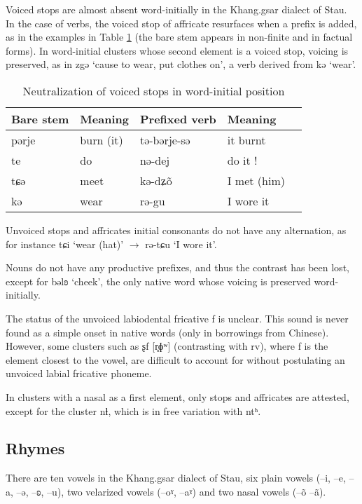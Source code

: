 \documentclass[oneside,a4paper,11pt]{article}
\newcommand{\ipa}[1]{{\phon #1}} %
\begin{document}
Voiced stops are almost absent word-initially in the Khang.gsar dialect of Stau. In the case of verbs, the voiced stop of affricate resurfaces when a prefix is added, as in the examples in Table \ref{tab:voiced} (the bare stem appears in non-finite and in factual forms). In word-initial clusters whose second element is a voiced stop, voicing is preserved, as in \ipa{zgə} `cause to wear, put clothes on', a verb derived from \ipa{kə} `wear'. 

 \begin{table}[H]
 \caption{Neutralization of voiced stops in word-initial position} \label{tab:voiced} \centering 
\begin{tabular}{lllll}
\toprule
Bare stem & Meaning & Prefixed verb & Meaning \\
\midrule
\ipa{pərje} & burn (it) &\ipa{tə-bərje-sə} & it burnt \\
\ipa{te} & do &\ipa{nə-dej} & do it !\\
\ipa{tɕə} & meet &\ipa{kə-dʑõ} & I met (him)\\
\ipa{kə} &wear &\ipa{rə-gu} & I wore it \\
\bottomrule
\end{tabular}
\end{table}
Unvoiced stops and affricates initial consonants do not have any alternation, as for instance \ipa{tɕi} `wear (hat)' $\rightarrow$ \ipa{rə-tɕu} `I wore it'.

Nouns do not have any productive prefixes, and thus the contrast has been lost, except for   \ipa{bəlʚ} `cheek', the only native word whose voicing is preserved word-initially.

 
The status of the unvoiced labiodental fricative \ipa{f} is unclear. This sound is never found as a simple onset in native words (only in borrowings from Chinese). However, some clusters such as  \ipa{ʂf} [\ipa{r̥ɸʷ}] (contrasting with \ipa{rv}), where \ipa{f} is the element closest to the vowel, are difficult to account for without postulating an unvoiced labial fricative phoneme.
 
 In clusters with a nasal as a first element, only stops and affricates are attested, except for the cluster \ipa{nɬ}, which is in free variation with \ipa{ntʰ}.
 
  \subsection{Rhymes}
 
There are ten vowels in the Khang.gsar dialect of Stau, six plain vowels (--\ipa{i}, --\ipa{e}, --\ipa{a}, --\ipa{ə}, --\ipa{ʚ},  --\ipa{u}), two velarized vowels (--\ipa{oˠ}, --\ipa{aˠ}) and two nasal vowels (--\ipa{õ}   --\ipa{ã}).
\end{document}
